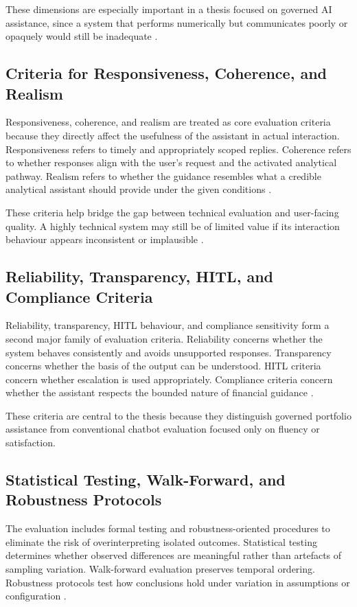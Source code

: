 \documentclass[11pt]{article}
\begin{document}
These dimensions are especially important in a thesis focused on governed AI assistance, since a system that performs numerically but communicates poorly or opaquely would still be inadequate \cite{adadi2018,aiact2024}.

\subsection{Criteria for Responsiveness, Coherence, and Realism}
Responsiveness, coherence, and realism are treated as core evaluation criteria because they directly affect the usefulness of the assistant in actual interaction. Responsiveness refers to timely and appropriately scoped replies. Coherence refers to whether responses align with the user's request and the activated analytical pathway. Realism refers to whether the guidance resembles what a credible analytical assistant should provide under the given conditions \cite{wu2023,ji2023}.

These criteria help bridge the gap between technical evaluation and user-facing quality. A highly technical system may still be of limited value if its interaction behaviour appears inconsistent or implausible \cite{amershi2014,arrieta2020}.

\subsection{Reliability, Transparency, HITL, and Compliance Criteria}
Reliability, transparency, HITL behaviour, and compliance sensitivity form a second major family of evaluation criteria. Reliability concerns whether the system behaves consistently and avoids unsupported responses. Transparency concerns whether the basis of the output can be understood. HITL criteria concern whether escalation is used appropriately. Compliance criteria concern whether the assistant respects the bounded nature of financial guidance \cite{mifid2014,gdpr2016,aiact2024}.

These criteria are central to the thesis because they distinguish governed portfolio assistance from conventional chatbot evaluation focused only on fluency or satisfaction.

\subsection{Statistical Testing, Walk-Forward, and Robustness Protocols}
The evaluation includes formal testing and robustness-oriented procedures to eliminate the risk of overinterpreting isolated outcomes. Statistical testing determines whether observed differences are meaningful rather than artefacts of sampling variation. Walk-forward evaluation preserves temporal ordering. Robustness protocols test how conclusions hold under variation in assumptions or configuration \cite{white2000,lo2002}.
\end{document}
